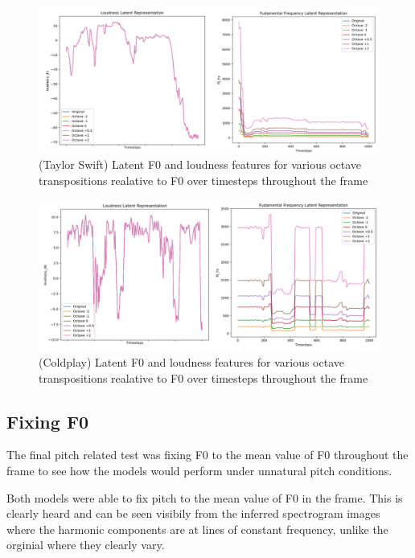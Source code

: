 \begin{figure}[!ht]
    \centering
    \includegraphics[width=\textwidth]{research/results/TaylorSwift/InferredTranspositionsGraphs.png}
    \caption{(Taylor Swift) Latent F0 and loudness features for various octave transpositions realative to F0 over timesteps throughout the frame}
\end{figure}

\begin{figure}[!ht]
    \centering
    \includegraphics[width=\textwidth]{research/results/Coldplay/InferredTranspositionsGraphs.png}
    \caption{(Coldplay) Latent F0 and loudness features for various octave transpositions realative to F0 over timesteps throughout the frame}
\end{figure}

\subsection{Fixing F0}

The final pitch related test was fixing F0 to the mean value of F0 throughout the frame to see how the models would perform under unnatural pitch conditions.

Both models were able to fix pitch to the mean value of F0 in the frame. This is clearly heard and can be seen visibily from the inferred spectrogram images where the harmonic components are at lines of constant frequency, unlike the orginial where they clearly vary.

